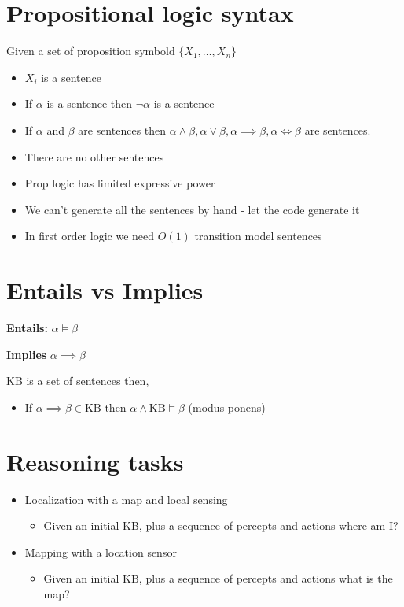 \section{Propositional logic syntax}
 Given a set of proposition symbold $\{X_1,\dots,X_n\}$
 \begin{itemize}
     \item $X_i$ is a sentence
     \item If $\alpha$ is a sentence then $\neg \alpha$ is a sentence
     \item If $\alpha$ and $\beta$ are sentences then $\alpha \wedge \beta, \alpha \vee \beta, \alpha \implies \beta, \alpha \iff \beta$ are sentences.
     \item There are no other sentences 
 \end{itemize}

 \begin{itemize}
     \item Prop logic has limited expressive power
     \item We can't generate all the sentences by hand - let the code generate it
     \item In first order logic we need $O(1)$ transition model sentences
 \end{itemize}


 \section{Entails vs Implies}
 \textbf{Entails: }  $\alpha \models \beta$

 \textbf{Implies}  $\alpha \implies \beta$ 

 KB is a set of sentences then,
 \begin{itemize}
     \item If $\alpha \implies \beta \in \text{KB}$ then  $\alpha \wedge \text{KB} \models \beta$ (modus ponens)
 \end{itemize}


 \section{Reasoning tasks}
 \begin{itemize}
     \item Localization with a map and local sensing
         \begin{itemize}
             \item Given an initial KB, plus a sequence of percepts and actions where am I?
         \end{itemize}
     \item Mapping with a location sensor
         \begin{itemize}
             \item Given an initial KB, plus a sequence of percepts  and actions what is the map?
         \end{itemize}
 \end{itemize}


